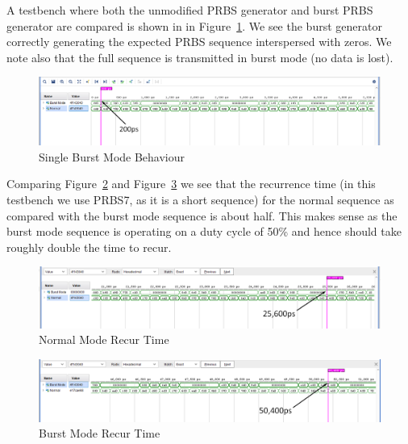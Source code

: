 A testbench where both the unmodified PRBS generator and burst PRBS generator
are compared is shown in in Figure~\ref{fig:burst_mode_start}.  We see the
burst generator correctly generating the expected PRBS sequence interspersed
with zeros. We note also that the full sequence is transmitted in burst mode (no
data is lost).

\begin{figure}[ht]
    \centering
    \hspace*{-3cm}\includegraphics[width=1.5\linewidth]{img/burst_mode_1.png}
    \caption{Single Burst Mode Behaviour}%
    \label{fig:burst_mode_start}
\end{figure}

Comparing Figure~\ref{fig:normal_mode_recur} and
Figure~\ref{fig:burst_mode_recur} we see that the recurrence time (in this
testbench we use PRBS7, as it is a short sequence) for the normal sequence as
compared with the burst mode sequence is about half. This makes sense as the
burst mode sequence is operating on a duty cycle of 50\% and hence should take
roughly double the time to recur.

\begin{figure}[ht]
    \centering
    \hspace*{-3cm}\includegraphics[width=1.5\linewidth]{img/burst_mode_2.png}
    \caption{Normal Mode Recur Time}%
    \label{fig:normal_mode_recur}
\end{figure}

\begin{figure}[ht]
    \centering
    \hspace*{-3cm}\includegraphics[width=1.5\linewidth]{img/burst_mode_3.png}
    \caption{Burst Mode Recur Time}%
    \label{fig:burst_mode_recur}
\end{figure}

